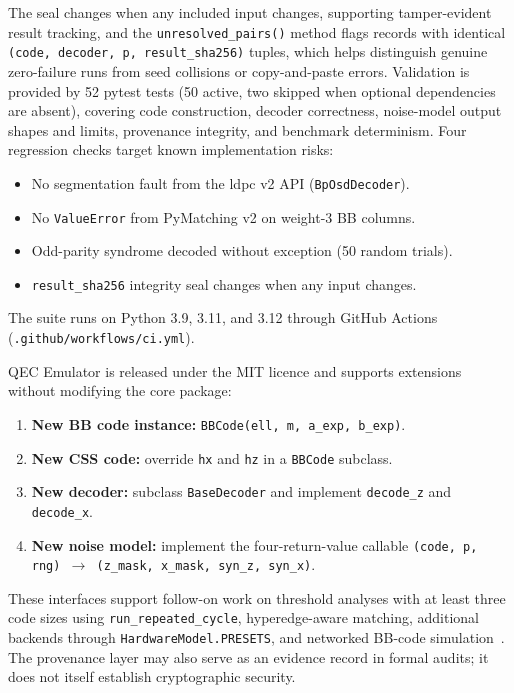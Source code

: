 \documentclass[pdflatex,sn-mathphys-num]{sn-jnl}
\theoremstyle{thmstyleone}
\theoremstyle{thmstyletwo}
\theoremstyle{thmstylethree}
\begin{document}
The seal changes when any included input changes, supporting tamper-evident result tracking, and the \texttt{unresolved\_pairs()} method flags records with identical \texttt{(code, decoder, p, result\_sha256)} tuples, which helps distinguish genuine zero-failure runs from seed collisions or copy-and-paste errors. Validation is provided by 52 pytest tests (50 active, two skipped when optional dependencies are absent), covering code construction, decoder correctness, noise-model output shapes and limits, provenance integrity, and benchmark determinism. Four regression checks target known implementation risks:
\begin{itemize}[leftmargin=1.6em,itemsep=0pt]
  \item No segmentation fault from the ldpc v2 API (\texttt{BpOsdDecoder}).
  \item No \texttt{ValueError} from PyMatching v2 on weight-3 BB columns.
  \item Odd-parity syndrome decoded without exception (50 random trials).
  \item \texttt{result\_sha256} integrity seal changes when any input changes.
\end{itemize}
The suite runs on Python 3.9, 3.11, and 3.12 through GitHub Actions (\texttt{.github/workflows/ci.yml}).

QEC Emulator is released under the MIT licence and supports extensions without modifying the core package:
\begin{enumerate}[leftmargin=1.6em]
  \item \textbf{New BB code instance:} \texttt{BBCode(ell, m, a\_exp, b\_exp)}.
  \item \textbf{New CSS code:} override \texttt{hx} and \texttt{hz} in a \texttt{BBCode} subclass.
  \item \textbf{New decoder:} subclass \texttt{BaseDecoder} and implement \texttt{decode\_z} and \texttt{decode\_x}.
  \item \textbf{New noise model:} implement the four-return-value callable \texttt{(code, p, rng) $\to$ (z\_mask, x\_mask, syn\_z, syn\_x)}.
\end{enumerate}
These interfaces support follow-on work on threshold analyses with at least three code sizes using \texttt{run\_repeated\_cycle}, hyperedge-aware matching, additional backends through \texttt{HardwareModel.PRESETS}, and networked BB-code simulation~\cite{ShawRengaswamy2026}. The provenance layer may also serve as an evidence record in formal audits; it does not itself establish cryptographic security.
\end{document}
